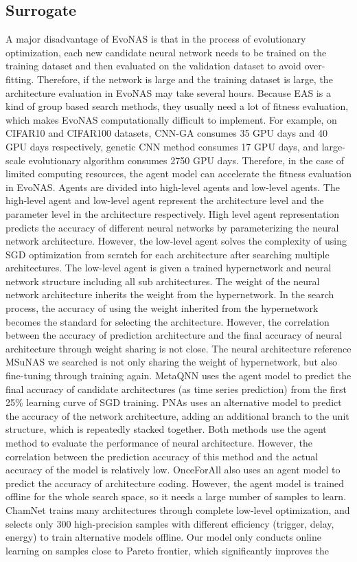 \documentclass[lettersize,journal]{IEEEtran}
\begin{document}
\subsection{Surrogate}
A major disadvantage of EvoNAS is that in the process of evolutionary optimization, each new candidate neural network needs to be trained on the training dataset and then evaluated on the validation dataset to avoid over-fitting. Therefore, if the network is large and the training dataset is large, the architecture evaluation in EvoNAS may take several hours. Because EAS is a kind of group based search methods, they usually need a lot of fitness evaluation, which makes EvoNAS computationally difficult to implement. For example, on CIFAR10 and CIFAR100 datasets, CNN-GA \cite{59} consumes 35 GPU days and 40 GPU days respectively, genetic CNN method \cite{60} consumes 17 GPU days, and large-scale evolutionary algorithm \cite{61} consumes 2750 GPU days. Therefore, in the case of limited computing resources, the agent model can accelerate the fitness evaluation in EvoNAS. Agents are divided into high-level agents and low-level agents. The high-level agent and low-level agent represent the architecture level and the parameter level in the architecture respectively. High level agent representation predicts the accuracy of different neural networks by parameterizing the neural network architecture. However, the low-level agent solves the complexity of using SGD optimization from scratch for each architecture after searching multiple architectures. The low-level agent is given a trained hypernetwork and neural network structure including all sub architectures. The weight of the neural network architecture inherits the weight from the hypernetwork. In the search process, the accuracy of using the weight inherited from the hypernetwork becomes the standard for selecting the architecture. However, the correlation between the accuracy of prediction architecture and the final accuracy of neural architecture through weight sharing is not close. The neural architecture reference MSuNAS \cite{62} we searched is not only sharing the weight of hypernetwork, but also fine-tuning through training again. MetaQNN \cite{63} uses the agent model to predict the final accuracy of candidate architectures (as time series prediction) from the first 25\% learning curve of SGD training. PNAs \cite{64} uses an alternative model to predict the accuracy of the network architecture, adding an additional branch to the unit structure, which is repeatedly stacked together. Both methods use the agent method to evaluate the performance of neural architecture. However, the correlation between the prediction accuracy of this method and the actual accuracy of the model is relatively low. OnceForAll \cite{65} also uses an agent model to predict the accuracy of architecture coding. However, the agent model is trained offline for the whole search space, so it needs a large number of samples to learn. ChamNet \cite{66} trains many architectures through complete low-level optimization, and selects only 300 high-precision samples with different efficiency (trigger, delay, energy) to train alternative models offline. Our model only conducts online learning on samples close to Pareto frontier, which significantly improves the 
\end{document}
